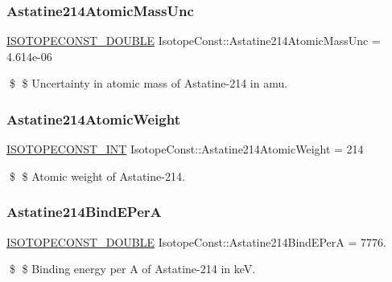\subsubsection{\texorpdfstring{Astatine214\+Atomic\+Mass\+Unc}{Astatine214AtomicMassUnc}}
{\footnotesize\ttfamily \mbox{\hyperlink{group___isotope_const-_macros_ga8f45a7272ce02c0b4c65c44636ed719a}{I\+S\+O\+T\+O\+P\+E\+C\+O\+N\+S\+T\+\_\+\+D\+O\+U\+B\+LE}} Isotope\+Const\+::\+Astatine214\+Atomic\+Mass\+Unc = 4.\+614e-\/06}

\$ \$ Uncertainty in atomic mass of Astatine-\/214 in amu. \mbox{\label{group___isotope_const-_astatine-_at214_gaa48b4aeca13aa83bd2bcaf7cc5330db5}} 
\subsubsection{\texorpdfstring{Astatine214\+Atomic\+Weight}{Astatine214AtomicWeight}}
{\footnotesize\ttfamily \mbox{\hyperlink{group___isotope_const-_macros_ga5f18360b3e99483a35c32d789e62621c}{I\+S\+O\+T\+O\+P\+E\+C\+O\+N\+S\+T\+\_\+\+I\+NT}} Isotope\+Const\+::\+Astatine214\+Atomic\+Weight = 214}

\$ \$ Atomic weight of Astatine-\/214. \mbox{\label{group___isotope_const-_astatine-_at214_ga97fa8cc91afa53ac7e18f2e872309c2c}} 
\subsubsection{\texorpdfstring{Astatine214\+Bind\+E\+PerA}{Astatine214BindEPerA}}
{\footnotesize\ttfamily \mbox{\hyperlink{group___isotope_const-_macros_ga8f45a7272ce02c0b4c65c44636ed719a}{I\+S\+O\+T\+O\+P\+E\+C\+O\+N\+S\+T\+\_\+\+D\+O\+U\+B\+LE}} Isotope\+Const\+::\+Astatine214\+Bind\+E\+PerA = 7776.}

\$ \$ Binding energy per A of Astatine-\/214 in keV. \mbox{\label{group___isotope_const-_astatine-_at214_gae0bd2e929744300f421899dc2a0efd1b}} 

